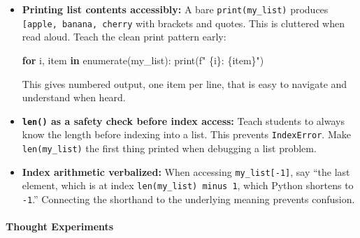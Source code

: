 \documentclass[
  justified,
  openright,
]{tufte-book}
\let\paragraph\paragraph
\newcommand{\KeywordTok}[1]{\textcolor{CodeKeyword}{\textbf{#1}}}  %
\newcommand{\StringTok}[1]{\textcolor{CodeString}{#1}}              %
\newenvironment{Shaded}{%
  \begin{mdframed}[style=TufteCode]%
}{%
  \end{mdframed}%
}
\let\paragraph\paragraph
\begin{document}
\begin{itemize}
\item
  \textbf{Printing list contents accessibly:} A bare
  \texttt{print(my\_list)} produces
  \texttt{{[}\textquotesingle{}apple\textquotesingle{},\ \textquotesingle{}banana\textquotesingle{},\ \textquotesingle{}cherry\textquotesingle{}{]}}
  with brackets and quotes. This is cluttered when read aloud. Teach the
  clean print pattern early:

\begin{Shaded}
\begin{Highlighting}[]
\KeywordTok{for} i, item \KeywordTok{in} enumerate(my\_list):
    print(\StringTok{f"  }\StringTok{\{}i\StringTok{\}}\StringTok{: }\StringTok{\{}item\StringTok{\}}\StringTok{"})
\end{Highlighting}
\end{Shaded}

  This gives numbered output, one item per line, that is easy to
  navigate and understand when heard.
\item
  \textbf{\texttt{len()} as a safety check before index access:} Teach
  students to always know the length before indexing into a list. This
  prevents \texttt{IndexError}. Make \texttt{len(my\_list)} the first
  thing printed when debugging a list problem.
\item
  \textbf{Index arithmetic verbalized:} When accessing
  \texttt{my\_list{[}-1{]}}, say ``the last element, which is at index
  \texttt{len(my\_list)\ minus\ 1}, which Python shortens to
  \texttt{-1}.'' Connecting the shorthand to the underlying meaning
  prevents confusion.
\end{itemize}

\paragraph{Thought Experiments}\label{thought-experiments-10}
\end{document}
